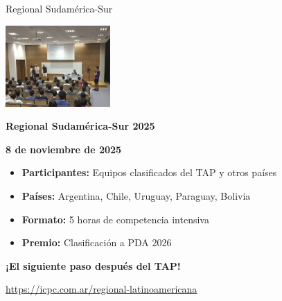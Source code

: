 \documentclass{beamer}
\begin{document}
\begin{frame}{Regional Sudamérica-Sur}
\begin{center}
\includegraphics[width=0.3\textwidth,keepaspectratio]{img/regional_logo.jpg}

\vspace{0.2cm}

\Large
\textbf{Regional Sudamérica-Sur 2025}

\vspace{0.1cm}

\normalsize
\textbf{8 de noviembre de 2025}

\vspace{0.1cm}

\begin{itemize}
\item \textbf{Participantes:} Equipos clasificados del TAP y otros países
\item \textbf{Países:} Argentina, Chile, Uruguay, Paraguay, Bolivia
\item \textbf{Formato:} 5 horas de competencia intensiva
\item \textbf{Premio:} Clasificación a PDA 2026
\end{itemize}

\vspace{0.1cm}

\textbf{¡El siguiente paso después del TAP!}

\small
\url{https://icpc.com.ar/regional-latinoamericana}
\end{center}
\end{frame}
\end{document}
